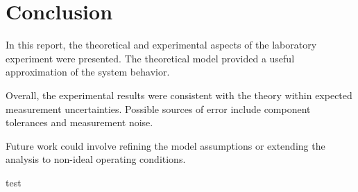 \section{Conclusion}
\label{sec:conclusion}

In this report, the theoretical and experimental aspects of the laboratory experiment
were presented. The theoretical model provided a useful approximation of the system
behavior.

Overall, the experimental results were consistent with the theory within expected
measurement uncertainties. Possible sources of error include component tolerances
and measurement noise.

Future work could involve refining the model assumptions or extending the analysis
to non-ideal operating conditions.

test